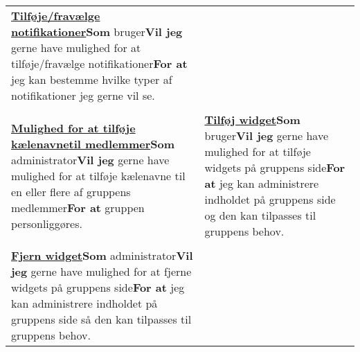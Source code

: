 \begin{tabular}{p{2.5in}p{2.5in}}
\textbf{\underline{Tilføje/fravælge notifikationer}}\newline \textbf{Som} bruger\newline \textbf{Vil jeg} gerne have mulighed for at tilføje/fravælge notifikationer\newline \textbf{For at} jeg kan bestemme hvilke typer af notifikationer jeg gerne vil se.  \\\\

\textbf{\underline{Mulighed for at tilføje kælenavne}}\newline \textbf{\underline{til medlemmer}}\newline \textbf{Som} administrator\newline \textbf{Vil jeg} gerne have mulighed for at tilføje kælenavne til en eller flere af gruppens medlemmer\newline \textbf{For at} gruppen personliggøres.  &

\textbf{\underline{Tilføj widget}}\newline \textbf{Som} bruger\newline \textbf{Vil jeg} gerne have mulighed for at tilføje widgets på gruppens side\newline \textbf{For at} jeg kan administrere indholdet på gruppens side og den kan tilpasses til gruppens behov.  \\\\

\textbf{\underline{Fjern widget}}\newline \textbf{Som} administrator\newline \textbf{Vil jeg} gerne have mulighed for at fjerne widgets på gruppens side\newline \textbf{For at} jeg kan administrere indholdet på gruppens side så den kan tilpasses til gruppens behov. 

\end{tabular}







